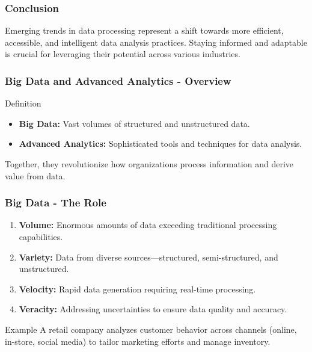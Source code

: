\documentclass{beamer}
\begin{document}
\begin{frame}[fragile]
    \frametitle{Conclusion}
    Emerging trends in data processing represent a shift towards more efficient, accessible, and intelligent data analysis practices. Staying informed and adaptable is crucial for leveraging their potential across various industries.
\end{frame}

\begin{frame}[fragile]
    \frametitle{Big Data and Advanced Analytics - Overview}
    \begin{block}{Definition}
        \begin{itemize}
            \item \textbf{Big Data:} Vast volumes of structured and unstructured data.
            \item \textbf{Advanced Analytics:} Sophisticated tools and techniques for data analysis.
        \end{itemize}
    \end{block}
    Together, they revolutionize how organizations process information and derive value from data.
\end{frame}

\begin{frame}[fragile]
    \frametitle{Big Data - The Role}
    \begin{enumerate}
        \item \textbf{Volume:} Enormous amounts of data exceeding traditional processing capabilities.
        \item \textbf{Variety:} Data from diverse sources—structured, semi-structured, and unstructured.
        \item \textbf{Velocity:} Rapid data generation requiring real-time processing.
        \item \textbf{Veracity:} Addressing uncertainties to ensure data quality and accuracy.
    \end{enumerate}
    \begin{block}{Example}
        A retail company analyzes customer behavior across channels (online, in-store, social media) to tailor marketing efforts and manage inventory.
    \end{block}
\end{frame}
\end{document}
